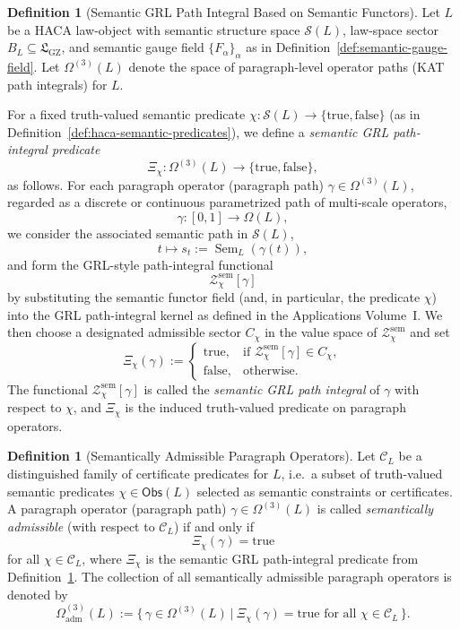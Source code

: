 \documentclass[11pt]{book}
\theoremstyle{plain}
\theoremstyle{definition}
\newtheorem{definition}[theorem]{Definition}
\theoremstyle{remark}
\newcommand{\GZLS}{\ensuremath{\mathfrak{L}_{\mathrm{GZ}}}}       \newcommand{\GZLT}{\ensuremath{M_{!w}}}                           \newcommand{\GZLOC}{\ensuremath{A_M}}                             \newcommand{\GZLC}{\ensuremath{\omega_{\mathrm{law}}}}            \newcommand{\GZLCurv}{\ensuremath{\mathcal{F}_{\mathrm{law}}}}
\begin{document}
\begin{definition}[Semantic GRL Path Integral Based on Semantic Functors]
\label{def:semantic-grl-path-integral}
Let $L$ be a HACA law-object with semantic structure space
$\mathcal{S}(L)$, law-space sector $B_L\subseteq\GZLS$, and semantic
gauge field $\{F_\alpha\}_\alpha$ as in
Definition~\ref{def:semantic-gauge-field}. Let
$\Omega^{(3)}(L)$ denote the space of paragraph-level operator
paths (KAT path integrals) for $L$.

For a fixed truth-valued semantic predicate
$\chi:\mathcal{S}(L)\to\{\mathrm{true},\mathrm{false}\}$ (as in
Definition~\ref{def:haca-semantic-predicates}), we define a
\emph{semantic GRL path-integral predicate}
\[
  \Xi_\chi : \Omega^{(3)}(L)\longrightarrow
  \{\mathrm{true},\mathrm{false}\},
\]
as follows. For each paragraph operator (paragraph path)
$\gamma\in\Omega^{(3)}(L)$, regarded as a discrete or continuous
parametrized path of multi-scale operators,
\[
  \gamma : [0,1]\to \Omega(L),
\]
we consider the associated semantic path in $\mathcal{S}(L)$,
\[
  t\longmapsto s_t := \operatorname{Sem}_L(\gamma(t)),
\]
and form the GRL-style path-integral functional
\[
  \mathcal{Z}^{\mathrm{sem}}_\chi[\gamma]
\]
by substituting the semantic functor field (and, in particular,
the predicate $\chi$) into the GRL path-integral kernel as defined in
the Applications Volume~I. We then choose a designated admissible sector
$C_\chi$ in the value space of $\mathcal{Z}^{\mathrm{sem}}_\chi$ and
set
\[
  \Xi_\chi(\gamma)
  :=
  \begin{cases}
    \mathrm{true}, & \text{if }
    \mathcal{Z}^{\mathrm{sem}}_\chi[\gamma]\in C_\chi,\\[2pt]
    \mathrm{false}, & \text{otherwise.}
  \end{cases}
\]
The functional $\mathcal{Z}^{\mathrm{sem}}_\chi[\gamma]$ is called the
\emph{semantic GRL path integral} of $\gamma$ with respect to $\chi$,
and $\Xi_\chi$ is the induced truth-valued predicate on paragraph
operators.

\end{definition}

\begin{definition}[Semantically Admissible Paragraph Operators]
\label{def:semantically-admissible-paragraph-operators}
Let $\mathcal{C}_L$ be a distinguished family of certificate
predicates for $L$, i.e.\ a subset of truth-valued semantic predicates
$\chi\in\mathsf{Obs}(L)$ selected as semantic constraints or
certificates. A paragraph operator (paragraph path)
$\gamma\in\Omega^{(3)}(L)$ is called \emph{semantically admissible}
(with respect to $\mathcal{C}_L$) if and only if
\[
  \Xi_\chi(\gamma)=\mathrm{true}
\]
for all $\chi\in\mathcal{C}_L$, where $\Xi_\chi$ is the semantic GRL
path-integral predicate from
Definition~\ref{def:semantic-grl-path-integral}. The collection of all
semantically admissible paragraph operators is denoted by
\[
  \Omega^{(3)}_{\mathrm{adm}}(L)
  :=
  \bigl\{\,
    \gamma\in\Omega^{(3)}(L)\ \big|\ 
    \Xi_\chi(\gamma)=\mathrm{true}
    \text{ for all }\chi\in\mathcal{C}_L
  \,\bigr\}.
\]

\end{definition}
\end{document}
